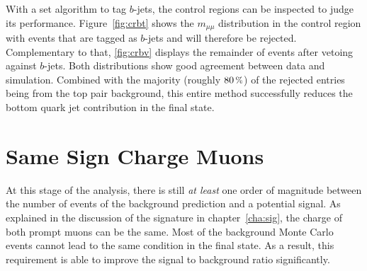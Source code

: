 With a set algorithm to tag $b$-jets, the control regions can be inspected to judge its performance. Figure~\ref{fig:crbt} shows the $m_{\mu \mu}$ distribution in the control region with events that are tagged as $b$-jets and will therefore be rejected. Complementary to that, \ref{fig:crbv} displays the remainder of events after vetoing against $b$-jets. Both distributions show good agreement between data and simulation. Combined with the majority (roughly $80\,\pct$) of the rejected entries being from the top pair background, this entire method successfully reduces the bottom quark jet contribution in the final state.


\section{Same Sign Charge Muons}
\label{sec:sscmuons}

At this stage of the analysis, there is still \textit{at least} one order of magnitude between the number of events of the background prediction and a potential signal. As explained in the discussion of the signature in chapter~\ref{cha:sig}, the charge of both prompt muons can be the same. Most of the background Monte Carlo events cannot lead to the same condition in the final state. As a result, this requirement is able to improve the signal to background ratio significantly.

